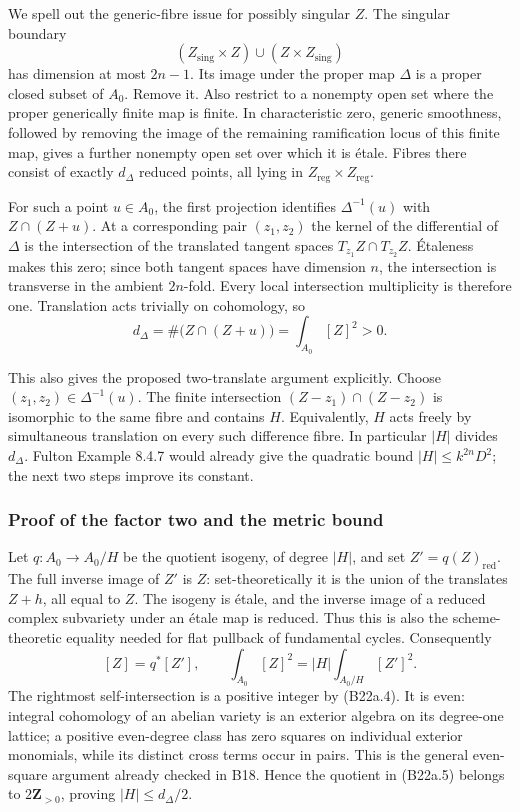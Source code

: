 \documentclass[11pt,a4paper]{article}
\theoremstyle{definition}
\begin{document}
We spell out the generic-fibre issue for possibly singular \(Z\). The singular boundary \[
 (Z_{\mathrm{sing}}\times Z)\cup(Z\times Z_{\mathrm{sing}})
\] has dimension at most \(2n-1\). Its image under the proper map \(\Delta\) is a proper closed subset of \(A_0\). Remove it. Also restrict to a nonempty open set where the proper generically finite map is finite. In characteristic zero, generic smoothness, followed by removing the image of the remaining ramification locus of this finite map, gives a further nonempty open set over which it is étale. Fibres there consist of exactly \(d_\Delta\) reduced points, all lying in \(Z_{\mathrm{reg}}\times Z_{\mathrm{reg}}\).

For such a point \(u\in A_0\), the first projection identifies \(\Delta^{-1}(u)\) with \(Z\cap(Z+u)\). At a corresponding pair \((z_1,z_2)\) the kernel of the differential of \(\Delta\) is the intersection of the translated tangent spaces \(T_{z_1}Z\cap T_{z_2}Z\). Étaleness makes this zero; since both tangent spaces have dimension \(n\), the intersection is transverse in the ambient \(2n\)-fold. Every local intersection multiplicity is therefore one. Translation acts trivially on cohomology, so \[
 d_\Delta=\#\bigl(Z\cap(Z+u)\bigr)=\int_{A_0}[Z]^2>0.
\tag{B22a.4}
\]

This also gives the proposed two-translate argument explicitly. Choose \((z_1,z_2)\in\Delta^{-1}(u)\). The finite intersection \((Z-z_1)\cap(Z-z_2)\) is isomorphic to the same fibre and contains \(H\). Equivalently, \(H\) acts freely by simultaneous translation on every such difference fibre. In particular \(|H|\) divides \(d_\Delta\). Fulton Example 8.4.7 would already give the quadratic bound \(|H|\le k^{2n}D^2\); the next two steps improve its constant.

\subsubsection{Proof of the factor two and the metric bound}\label{proof-of-the-factor-two-and-the-metric-bound}

Let \(q:A_0\to A_0/H\) be the quotient isogeny, of degree \(|H|\), and set \(Z'=q(Z)_{\mathrm{red}}\). The full inverse image of \(Z'\) is \(Z\): set-theoretically it is the union of the translates \(Z+h\), all equal to \(Z\). The isogeny is étale, and the inverse image of a reduced complex subvariety under an étale map is reduced. Thus this is also the scheme-theoretic equality needed for flat pullback of fundamental cycles. Consequently \[
 [Z]=q^*[Z'],\qquad
 \int_{A_0}[Z]^2=|H|\int_{A_0/H}[Z']^2.
\tag{B22a.5}
\] The rightmost self-intersection is a positive integer by (B22a.4). It is even: integral cohomology of an abelian variety is an exterior algebra on its degree-one lattice; a positive even-degree class has zero squares on individual exterior monomials, while its distinct cross terms occur in pairs. This is the general even-square argument already checked in B18. Hence the quotient in (B22a.5) belongs to \(2\mathbf Z_{>0}\), proving \(|H|\le d_\Delta/2\).
\end{document}
